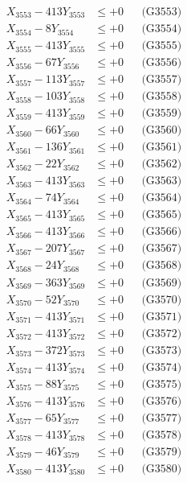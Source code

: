 \documentclass[a4paper,10pt]{article}
\begin{document}
{\begin{align}
X_{3553} - 413Y_{3553} &\leq +0 && \text{(G3553)} \\
X_{3554} - 8Y_{3554} &\leq +0 && \text{(G3554)} \\
X_{3555} - 413Y_{3555} &\leq +0 && \text{(G3555)} \\
X_{3556} - 67Y_{3556} &\leq +0 && \text{(G3556)} \\
X_{3557} - 113Y_{3557} &\leq +0 && \text{(G3557)} \\
X_{3558} - 103Y_{3558} &\leq +0 && \text{(G3558)} \\
X_{3559} - 413Y_{3559} &\leq +0 && \text{(G3559)} \\
X_{3560} - 66Y_{3560} &\leq +0 && \text{(G3560)} \\
\allowbreak
X_{3561} - 136Y_{3561} &\leq +0 && \text{(G3561)} \\
X_{3562} - 22Y_{3562} &\leq +0 && \text{(G3562)} \\
X_{3563} - 413Y_{3563} &\leq +0 && \text{(G3563)} \\
X_{3564} - 74Y_{3564} &\leq +0 && \text{(G3564)} \\
X_{3565} - 413Y_{3565} &\leq +0 && \text{(G3565)} \\
X_{3566} - 413Y_{3566} &\leq +0 && \text{(G3566)} \\
X_{3567} - 207Y_{3567} &\leq +0 && \text{(G3567)} \\
X_{3568} - 24Y_{3568} &\leq +0 && \text{(G3568)} \\
X_{3569} - 363Y_{3569} &\leq +0 && \text{(G3569)} \\
X_{3570} - 52Y_{3570} &\leq +0 && \text{(G3570)} \\
\allowbreak
X_{3571} - 413Y_{3571} &\leq +0 && \text{(G3571)} \\
X_{3572} - 413Y_{3572} &\leq +0 && \text{(G3572)} \\
X_{3573} - 372Y_{3573} &\leq +0 && \text{(G3573)} \\
X_{3574} - 413Y_{3574} &\leq +0 && \text{(G3574)} \\
X_{3575} - 88Y_{3575} &\leq +0 && \text{(G3575)} \\
X_{3576} - 413Y_{3576} &\leq +0 && \text{(G3576)} \\
X_{3577} - 65Y_{3577} &\leq +0 && \text{(G3577)} \\
X_{3578} - 413Y_{3578} &\leq +0 && \text{(G3578)} \\
X_{3579} - 46Y_{3579} &\leq +0 && \text{(G3579)} \\
X_{3580} - 413Y_{3580} &\leq +0 && \text{(G3580)} \\

\end{align}}
\end{document}
